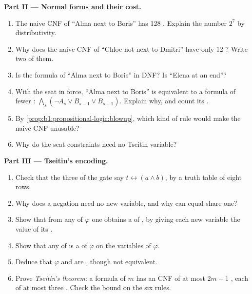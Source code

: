 \begin{problem}
\medskip\noindent\textbf{Part II --- Normal forms and their cost.}
\begin{enumerate}[resume]
\item The naive CNF of ``Alma next to Boris'' has 128 . Explain the number $2^7$ by distributivity.
\item Why does the naive CNF of ``Chloe not next to Dmitri'' have only 12 ? Write two of them.
\item Is the formula of ``Alma next to Boris'' in DNF? Is ``Elena at an end''?
\item With the seat  in force, ``Alma next to Boris'' is equivalent to a formula of fewer :
$\bigwedge_s (\neg A_s \vee B_{s-1} \vee B_{s+1})$. Explain why, and count its .
\item By \cref{prop:b1:propositional-logic:blowup}, which kind of rule would make the naive CNF unusable?
\item Why do the seat constraints need no Tseitin variable?
\end{enumerate}

\medskip\noindent\textbf{Part III --- Tseitin's encoding.}
\begin{enumerate}[resume]
\item Check that the three  of the \code{&} gate say $t \leftrightarrow (a \wedge b)$, by a truth table of eight
rows.
\item Why does a negation need no new variable, and why can equal  share one?
\item Show that from any  of $\varphi$ one obtains a  of , by giving each new variable the
value of its .
\item Show that any  of  is a  of $\varphi$ on the variables of $\varphi$.
\item Deduce that $\varphi$ and  are , though not equivalent.
\item Prove \emph{Tseitin's theorem}: a formula of  $m$ has an  CNF of at most $2m - 1$ ,
each of at most three . Check the bound on the six rules.
\end{enumerate}


\end{problem}
